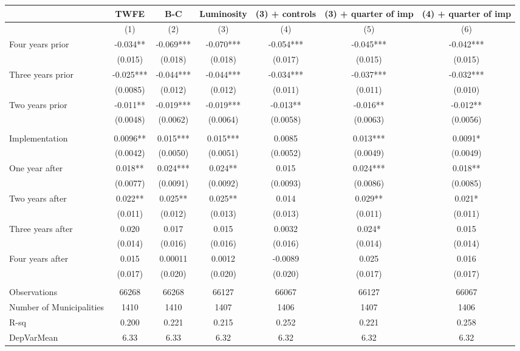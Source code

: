 \begin{tabular}{lcccccc}
\toprule
      & TWFE  & B-C   & Luminosity & (3) + controls & (3) + quarter of imp & (4) + quarter of imp \\
\midrule
      & (1)   & (2)   & (3)   & (4)   & (5)   & (6) \\
\midrule
\midrule
Four years prior & -0.034** & -0.069*** & -0.070*** & -0.054*** & -0.045*** & -0.042*** \\
      & (0.015) & (0.018) & (0.018) & (0.017) & (0.015) & (0.015) \\
Three years prior & -0.025*** & -0.044*** & -0.044*** & -0.034*** & -0.037*** & -0.032*** \\
      & (0.0085) & (0.012) & (0.012) & (0.011) & (0.011) & (0.010) \\
Two years prior & -0.011** & -0.019*** & -0.019*** & -0.013** & -0.016** & -0.012** \\
      & (0.0048) & (0.0062) & (0.0064) & (0.0058) & (0.0063) & (0.0056) \\
      &       &       &       &       &       &  \\
Implementation & 0.0096** & 0.015*** & 0.015*** & 0.0085 & 0.013*** & 0.0091* \\
      & (0.0042) & (0.0050) & (0.0051) & (0.0052) & (0.0049) & (0.0049) \\
One year after & 0.018** & 0.024*** & 0.024** & 0.015 & 0.024*** & 0.018** \\
      & (0.0077) & (0.0091) & (0.0092) & (0.0093) & (0.0086) & (0.0085) \\
Two years after & 0.022** & 0.025** & 0.025** & 0.014 & 0.029** & 0.021* \\
      & (0.011) & (0.012) & (0.013) & (0.013) & (0.011) & (0.011) \\
Three years after & 0.020 & 0.017 & 0.015 & 0.0032 & 0.024* & 0.015 \\
      & (0.014) & (0.016) & (0.016) & (0.016) & (0.014) & (0.014) \\
Four years after & 0.015 & 0.00011 & 0.0012 & -0.0089 & 0.025 & 0.016 \\
      & (0.017) & (0.020) & (0.020) & (0.020) & (0.017) & (0.017) \\
      &       &       &       &       &       &  \\
\midrule
Observations & 66268 & 66268 & 66127 & 66067 & 66127 & 66067 \\
Number of Municipalities & 1410  & 1410  & 1407  & 1406  & 1407  & 1406 \\
R-sq  & 0.200 & 0.221 & 0.215 & 0.252 & 0.221 & 0.258 \\
DepVarMean & 6.33  & 6.33  & 6.32  & 6.32  & 6.32  & 6.32 \\
\bottomrule
\bottomrule
\end{tabular}%
